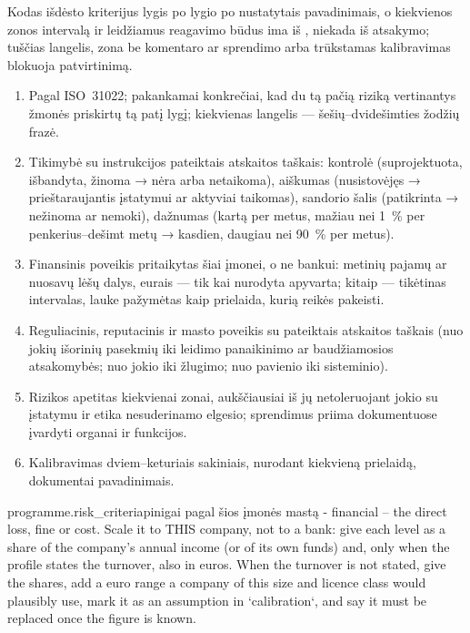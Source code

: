 Kodas išdėsto kriterijus lygis po lygio po nustatytais pavadinimais, o kiekvienos zonos
intervalą ir leidžiamus reagavimo būdus ima iš , niekada iš atsakymo; tuščias
langelis, zona be komentaro ar sprendimo arba trūkstamas kalibravimas blokuoja patvirtinimą.

\begin{enumerate}[itemsep=1pt, topsep=3pt]
  \item Pagal ISO~31022; pakankamai konkrečiai, kad du tą pačią riziką vertinantys žmonės
    priskirtų tą patį lygį; kiekvienas langelis --- šešių--dvidešimties žodžių frazė.
  \item Tikimybė su instrukcijos pateiktais atskaitos taškais: kontrolė (suprojektuota,
    išbandyta, žinoma → nėra arba netaikoma), aiškumas (nusistovėjęs → prieštaraujantis
    įstatymui ar aktyviai taikomas), sandorio šalis (patikrinta → nežinoma ar nemoki), dažnumas
    (kartą per metus, mažiau nei 1~\% per penkerius--dešimt metų → kasdien, daugiau nei 90~\%
    per metus).
  \item Finansinis poveikis pritaikytas šiai įmonei, o ne bankui: metinių pajamų ar nuosavų lėšų
    dalys, eurais --- tik kai nurodyta apyvarta; kitaip --- tikėtinas intervalas, lauke
     pažymėtas kaip prielaida, kurią reikės pakeisti.
  \item Reguliacinis, reputacinis ir masto poveikis su pateiktais atskaitos taškais (nuo jokių
    išorinių pasekmių iki leidimo panaikinimo ar baudžiamosios atsakomybės; nuo jokio iki
    žlugimo; nuo pavienio iki sisteminio).
  \item Rizikos apetitas kiekvienai zonai, aukščiausiai iš jų netoleruojant jokio su įstatymu ir
    etika nesuderinamo elgesio; sprendimus priima dokumentuose įvardyti organai ir funkcijos.
  \item Kalibravimas dviem--keturiais sakiniais, nurodant kiekvieną prielaidą, dokumentai
    pavadinimais.
\end{enumerate}

\par\nopagebreak
\begin{promptexcerpt}{programme.risk_criteria}{pinigai pagal šios įmonės mastą}
- financial – the direct loss, fine or cost. Scale it to THIS company, not to a bank: give each level as a share of the company's annual income (or of its own funds) and, only when the profile states the turnover, also in euros. When the turnover is not stated, give the shares, add a euro range a company of this size and licence class would plausibly use, mark it as an assumption in `calibration`, and say it must be replaced once the figure is known.
\end{promptexcerpt}

